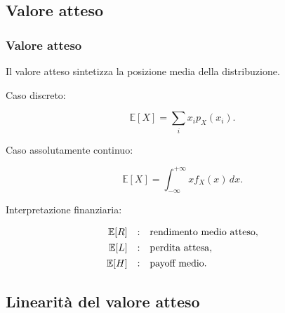 \documentclass[handout]{beamer}%
\providecommand{\E}{\mathbb{E}}
\providecommand{\1}{\mathbf{1}}
\providecommand{\QTR}[2]{\csname #1\endcsname{#2}}
\begin{document}


\subsection{Valore atteso}%

\begin{frame}%
%

\frametitle{Valore atteso}%


Il valore atteso sintetizza la posizione media della distribuzione.

\medskip

Caso discreto:%

\[
\E[X] = \sum_{i} x_{i} p_{X}(x_{i}).
\]


\medskip

Caso assolutamente continuo:%

\[
\E[X] = \int_{-\infty}^{+\infty}x f_{X}(x)\,dx.
\]


\medskip

Interpretazione finanziaria:%

\[%
\begin{array}
[c]{rcl}%
\E[R] & : & \mbox{rendimento medio atteso},\\[4pt]%
\E[L] & : & \mbox{perdita attesa},\\[4pt]%
\E[H] & : & \mbox{payoff medio}.
\end{array}
\]
%

\transboxout
\end{frame}%




\subsection{Linearit\`{a} del valore atteso}%
\end{document}
